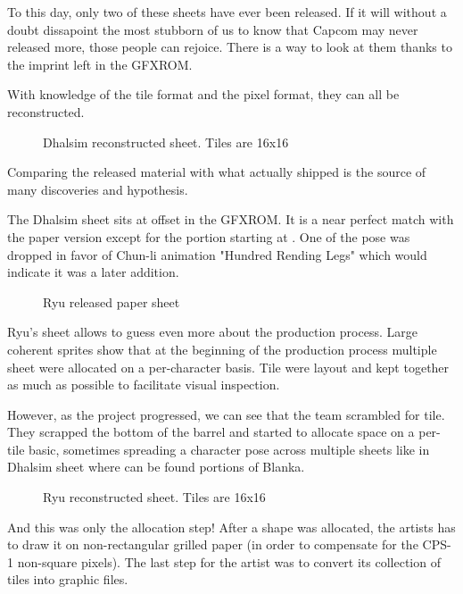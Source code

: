 To this day, only two of these sheets have ever been released\cite{fdasd}\cite{fs}. If it will without a doubt dissapoint the most stubborn of us to know that Capcom may never released more, those people can rejoice. There is a way to look at them thanks to the imprint left in the GFXROM. 

With knowledge of the tile format and the pixel format, they can all be reconstructed.




 \begin{figure}[H]
\caption*{Dhalsim reconstructed sheet. Tiles are 16x16}
\end{figure}

Comparing the released material with what actually shipped is the source of many discoveries and hypothesis. 


The Dhalsim sheet sits at offset  in the GFXROM. It is a near perfect match with the paper version except for the portion starting at . One of the pose was dropped in favor of Chun-li animation "Hundred Rending Legs" which would indicate it was a later addition. 

 \begin{figure}[H]
\caption*{Ryu released paper sheet}
\end{figure}

Ryu's sheet  allows to guess even more about the production process. Large coherent sprites show that at the beginning of the production process multiple sheet were allocated on a per-character basis. Tile were layout and kept together as much as possible to facilitate visual inspection.

However, as the project progressed, we can see that the team scrambled for tile. They scrapped the bottom of the barrel and started to allocate space on a per-tile basic, sometimes spreading a character pose across multiple sheets like in Dhalsim sheet where can be found portions of Blanka.

 \begin{figure}[H]
\caption*{Ryu reconstructed sheet. Tiles are 16x16}
\end{figure}


And this was only the allocation step! After a shape was allocated, the artists has to draw it on non-rectangular grilled paper (in order to compensate for the CPS-1 non-square pixels). The last step for the artist was to convert its collection of tiles into graphic files. 

